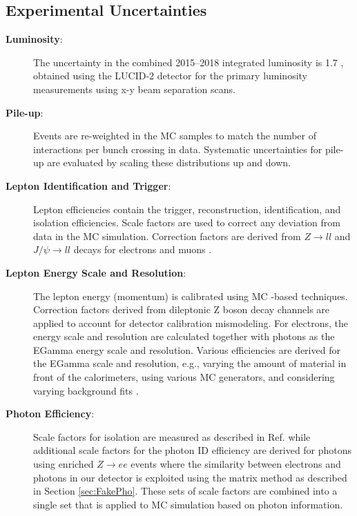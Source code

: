 \subsection{Experimental Uncertainties}
\begin{description}
\item[\textbf{Luminosity}:] The uncertainty in the combined 2015--2018 integrated luminosity is 1.7  \cite{ATLAS-CONF-2019-021}, obtained using the LUCID-2 detector \cite{LUCID2} for the primary luminosity measurements using x-y beam separation scans.

\item[\textbf{Pile-up}:]  Events are re-weighted in the MC samples to match the number of interactions per bunch crossing in data.  Systematic uncertainties for pile-up are evaluated by scaling these distributions up and down.

\item[\textbf{Lepton Identification and Trigger}:]   Lepton efficiencies contain the trigger, reconstruction, identification, and isolation efficiencies.  Scale factors are used to correct any deviation from data in the MC simulation.  Correction factors are derived from $Z\rightarrow ll$ and $J/ \psi \rightarrow ll$ decays for electrons \cite{ElectronID} and muons \cite{MuonID}.

\item[\textbf{Lepton Energy Scale and Resolution}:]  The lepton energy (momentum) is calibrated using MC -based techniques.  Correction factors derived from dileptonic Z boson decay channels are applied to account for detector calibration mismodeling.  For electrons, the energy scale and resolution are calculated together with photons as the EGamma energy scale and resolution.  Various efficiencies are derived for the EGamma scale and resolution, e.g., varying the amount of material in front of the calorimeters, using various MC generators, and considering varying background fits \cite{ElectronID, PhotonID}.
\item[\textbf{Photon Efficiency}:]  Scale factors for isolation are measured as described in Ref. \cite{Lesage:2017uzg} while additional scale factors for the photon ID efficiency are derived for photons using enriched $Z\rightarrow ee$ events where the similarity between electrons and photons in our detector is exploited using the matrix method as described in Section \ref{sec:FakePho}. These sets of scale factors are combined into a single set that is applied to MC simulation based on photon information.


\end{description}
